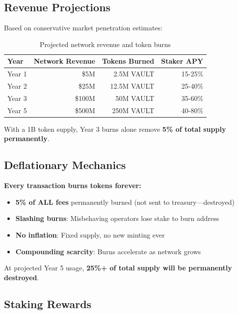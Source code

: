\documentclass[12pt,a4paper]{article}
\begin{document}
\subsection{Revenue Projections}

Based on conservative market penetration estimates:

\begin{table}[h]
\centering
\begin{tabular}{@{}lrrr@{}}
\toprule
\textbf{Year} & \textbf{Network Revenue} & \textbf{Tokens Burned} & \textbf{Staker APY} \\
\midrule
Year 1 & \$5M & 2.5M VAULT & 15-25\% \\
Year 2 & \$25M & 12.5M VAULT & 25-40\% \\
Year 3 & \$100M & 50M VAULT & 35-60\% \\
Year 5 & \$500M & 250M VAULT & 40-80\% \\
\bottomrule
\end{tabular}
\caption{Projected network revenue and token burns}
\end{table}

\noindent With a 1B token supply, Year 3 burns alone remove \textbf{5\% of total supply permanently}.

\subsection{Deflationary Mechanics}

\textbf{Every transaction burns tokens forever:}

\begin{itemize}
    \item \textbf{5\% of ALL fees} permanently burned (not sent to treasury—destroyed)
    \item \textbf{Slashing burns}: Misbehaving operators lose stake to burn address
    \item \textbf{No inflation}: Fixed supply, no new minting ever
    \item \textbf{Compounding scarcity}: Burns accelerate as network grows
\end{itemize}

\noindent At projected Year 5 usage, \textbf{25\%+ of total supply will be permanently destroyed}.

\subsection{Staking Rewards}
\end{document}
